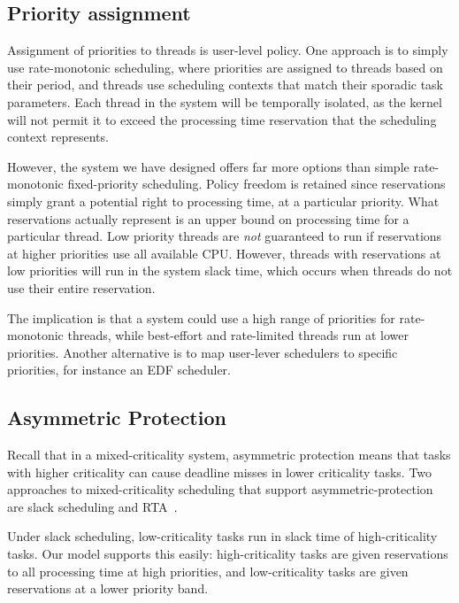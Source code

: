 \subsection{Priority assignment}

Assignment of priorities to threads is user-level policy. One approach is to simply use
rate-monotonic scheduling, where priorities are assigned to threads based on their period, and
threads use scheduling contexts that match their sporadic task parameters.  Each thread in the
system will be temporally isolated, as the kernel will not permit it to exceed the processing time
reservation that the scheduling context represents.

However, the system we have designed offers far more options than simple rate-monotonic fixed-priority
scheduling.  Policy freedom is retained since reservations simply grant a potential right to processing
time, at a particular priority.  What reservations actually represent is an upper bound on
processing time for a particular thread.  Low priority threads are \emph{not} guaranteed to run if
reservations at higher priorities use all available CPU.  However, threads with reservations at low
priorities will run in the system slack time, which occurs when threads do not use their entire
reservation.

The implication is that a system could use a high range of priorities for rate-monotonic threads,
while best-effort and rate-limited threads run at lower priorities.  Another alternative is to map
user-lever schedulers to specific  priorities, for instance an EDF scheduler. 

\subsection{Asymmetric Protection}

Recall that in a mixed-criticality system, asymmetric protection means that tasks with higher
criticality can cause deadline misses in lower criticality tasks.  Two approaches to 
mixed-criticality scheduling that support asymmetric-protection are slack scheduling and
\gls{RTA}~\citep{Burns_Davis_17}.

Under slack scheduling, low-criticality tasks run in slack time of high-criticality tasks.  Our
model supports this easily: high-criticality tasks are given reservations to all processing time at
high priorities, and low-criticality tasks are given reservations at a lower priority band.


